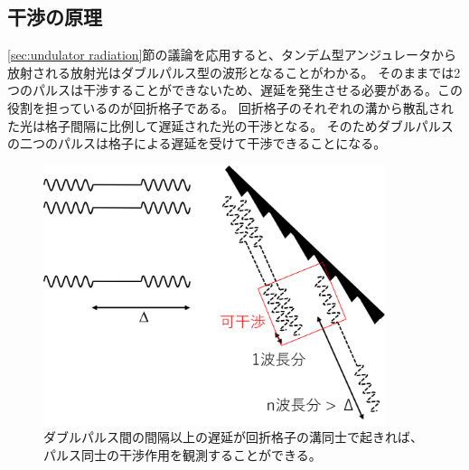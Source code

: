 \documentclass[a4paper,11pt,uplatex]{jsbook}
\begin{document}
\subsection{干渉の原理}\label{sec:interference}
\ref{sec:undulator radiation}節の議論を応用すると、タンデム型アンジュレータから放射される放射光はダブルパルス型の波形となることがわかる。
そのままでは2つのパルスは干渉することができないため、遅延を発生させる必要がある。この役割を担っているのが回折格子である。
回折格子のそれぞれの溝から散乱された光は格子間隔に比例して遅延された光の干渉となる。
そのためダブルパルスの二つのパルスは格子による遅延を受けて干渉できることになる。
\begin{figure}[b]
  \centering
  \includegraphics[width=10cm]{image/2-doublepulse.png}
  \caption[干渉の原理]{ダブルパルス間の間隔以上の遅延が回折格子の溝同士で起きれば、パルス同士の干渉作用を観測することができる。}
  \label{fig:doublepulse}
\end{figure}
\end{document}
